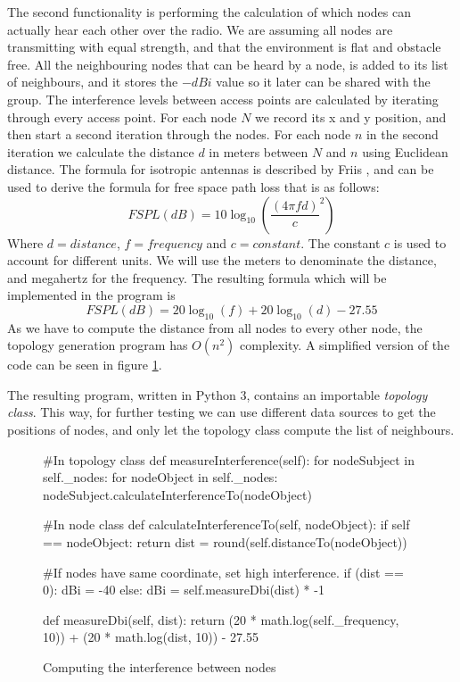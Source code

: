 	The second functionality is performing the calculation of which nodes can actually hear each other over the radio.
	We are assuming all nodes	are transmitting with equal strength, and that the environment is flat and obstacle free. 
	All the neighbouring nodes that can be heard by a node, is added to its list of neighbours, and it stores the $-dBi$ value so it later can be shared with
	the group. The interference levels between access points are calculated by iterating through every access point. For each node $N$ we record its x and y position,
	and then start a second iteration through the nodes. For each node $n$ in the second iteration we calculate the distance $d$ in
	meters between $N$ and $n$ using Euclidean distance. The formula for isotropic antennas is described by Friis \cite{Friis46}, and can be used to
	derive the formula for free space path loss \cite{FSPL} that is as follows:
\[
	FSPL(dB) = 10\log_{10} \left( \frac{ (4 \pi f d)}{c} ^2 \right) 
\]	
	Where $d = distance$, $f = frequency$ and $c=constant$. The constant $c$ is used to account for different units. We will use the meters to denominate the distance,
	and megahertz for the frequency. The resulting formula which will be implemented in the program is
\[
	FSPL(dB) = 20\log_{10}\left( f \right)  + 20\log_{10} \left(d\right) - 27.55
\]	
	As we have to compute the distance from all nodes to every other node, the topology generation program has $O(n^2)$ complexity. A simplified version of the code
	can be seen in figure \ref{fig:dbiCreation}. 

	The resulting program, written in Python 3\cite{Python3}, contains an importable \textit{topology class}. This way, for further testing we can use different data
	sources to get the positions of nodes, and only let the topology class compute the list of neighbours. 
	

	\begin{figure}[H]
	\begin{python}
#In topology class
def measureInterference(self):
 for nodeSubject in self._nodes:  
  for nodeObject in self._nodes:
    nodeSubject.calculateInterferenceTo(nodeObject) 

#In node class
def calculateInterferenceTo(self, nodeObject):
 if self == nodeObject:
  return
 dist = round(self.distanceTo(nodeObject))

#If  nodes have same coordinate, set high interference. 
 if (dist == 0):
  dBi = -40
 else:
  dBi  = self.measureDbi(dist) * -1

def measureDbi(self, dist):
 return (20 * math.log(self._frequency, 10)) + 
(20 * math.log(dist, 10)) - 27.55

			\end{python}
			\caption{Computing the interference between nodes}
			\label{fig:dbiCreation}
			\end{figure}

